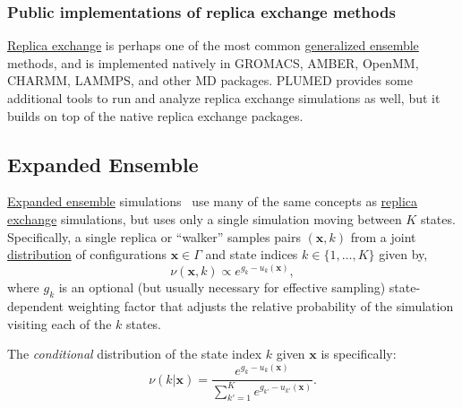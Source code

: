 \documentclass[9pt,review]{livecoms}
\newcommand{\vx}{\mathbf{x}}
\begin{document}
\subsubsection{Public implementations of replica exchange methods}

\hyperlink{ref:ReplEx} {Replica exchange} is perhaps one of the most common \hyperlink{ref:GenEns} {generalized ensemble} methods, and is implemented natively in GROMACS, AMBER, OpenMM, CHARMM, LAMMPS, and other MD packages. PLUMED provides some additional tools to run and analyze replica exchange simulations as well, but it builds on top of the native replica exchange packages.

\subsection{Expanded Ensemble}
\hyperlink{ref:ExpEns} {Expanded ensemble} simulations~\cite{lyubartsev:jcp:1992:expanded-ensembles} use many of the same concepts as \hyperlink{ref:ReplEx} {replica exchange} simulations, but uses only a single simulation moving between $K$ states. Specifically, a single replica or ``walker'' samples pairs $(\vx,k)$ from a joint \hyperlink{ref:Distribution} {distribution}  of configurations $\vx \in \Gamma$ and state indices $k \in \{1,\ldots,K\}$ given by,
\begin{equation}
\nu(\vx,k) \propto e^{g_k-u_k(\vx)},
\end{equation}
where $g_k$ is an optional (but usually necessary for effective sampling) state-dependent weighting factor that adjusts the relative probability of the simulation visiting each of the $k$ states.

The \emph{conditional} distribution of the state index $k$ given $\vx$ is specifically:
\begin{equation}
\nu(k | \vx) = \frac{e^{g_k - u_k(\vx)}}{\sum\limits_{k'=1}^K e^{g_{k'} - u_{k'}(\vx)}}.
\end{equation}
\end{document}
